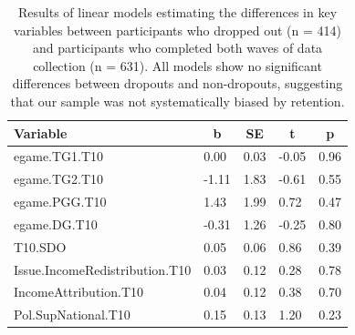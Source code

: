 \documentclass[
  man,floatsintext]{apa6}
\begin{document}
\begin{table}[H]

\begin{center}
\begin{threeparttable}

\caption{\label{tab:biasTable}Results of linear models estimating the differences in
key variables between participants who dropped out (n = 414) and participants
who completed both waves of data collection (n = 631). All models show no
significant differences between dropouts and non-dropouts, suggesting that our
sample was not systematically biased by retention.}

\begin{tabular}{lllll}
\toprule
Variable & \multicolumn{1}{c}{b} & \multicolumn{1}{c}{SE} & \multicolumn{1}{c}{t} & \multicolumn{1}{c}{p}\\
\midrule
egame.TG1.T10 & 0.00 & 0.03 & -0.05 & 0.96\\
egame.TG2.T10 & -1.11 & 1.83 & -0.61 & 0.55\\
egame.PGG.T10 & 1.43 & 1.99 & 0.72 & 0.47\\
egame.DG.T10 & -0.31 & 1.26 & -0.25 & 0.80\\
T10.SDO & 0.05 & 0.06 & 0.86 & 0.39\\
Issue.IncomeRedistribution.T10 & 0.03 & 0.12 & 0.28 & 0.78\\
IncomeAttribution.T10 & 0.04 & 0.12 & 0.38 & 0.70\\
Pol.SupNational.T10 & 0.15 & 0.13 & 1.20 & 0.23\\
\bottomrule
\end{tabular}

\end{threeparttable}
\end{center}

\end{table}

\newpage
\end{document}
